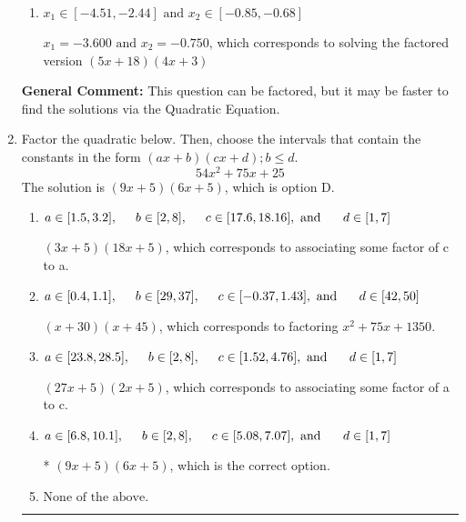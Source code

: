 \documentclass{extbook}[14pt]
\newcommand{\litem}[1]{\item #1

\rule{\textwidth}{0.4pt}}
\begin{document}
\begin{enumerate}
{\begin{enumerate}[label=\Alph*.]
$x_1 = -9.000 \text{ and } x_2 = -0.300$, which corresponds to solving the factored version $(x + 9)(20x + 6)$
\item \( x_1 \in [-4.51, -2.44] \text{ and } x_2 \in [-0.85, -0.68] \)

$x_1 = -3.600 \text{ and } x_2 = -0.750$, which corresponds to solving the factored version $(5x + 18)(4x + 3)$
\end{enumerate}

\textbf{General Comment:} This question can be factored, but it may be faster to find the solutions via the Quadratic Equation.
}
\litem{
Factor the quadratic below. Then, choose the intervals that contain the constants in the form $(ax+b)(cx+d); b \leq d.$
\[ 54x^{2} +75 x + 25 \]The solution is \( (9x + 5)(6x + 5) \), which is option D.\begin{enumerate}[label=\Alph*.]
\item \( a \in [1.5, 3.2], \hspace*{5mm} b \in [2, 8], \hspace*{5mm} c \in [17.6, 18.16], \text{ and } \hspace*{5mm} d \in [1, 7] \)

 $(3x + 5)(18x + 5)$, which corresponds to associating some factor of c to a.
\item \( a \in [0.4, 1.1], \hspace*{5mm} b \in [29, 37], \hspace*{5mm} c \in [-0.37, 1.43], \text{ and } \hspace*{5mm} d \in [42, 50] \)

 $(x + 30)(x + 45)$, which corresponds to factoring $x^{2} +75 x + 1350$.
\item \( a \in [23.8, 28.5], \hspace*{5mm} b \in [2, 8], \hspace*{5mm} c \in [1.52, 4.76], \text{ and } \hspace*{5mm} d \in [1, 7] \)

 $(27x + 5)(2x + 5)$, which corresponds to associating some factor of a to c.
\item \( a \in [6.8, 10.1], \hspace*{5mm} b \in [2, 8], \hspace*{5mm} c \in [5.08, 7.07], \text{ and } \hspace*{5mm} d \in [1, 7] \)

* $(9x + 5)(6x + 5)$, which is the correct option.
\item \( \text{None of the above.} \)


\end{enumerate}}
\end{enumerate}
\end{document}
